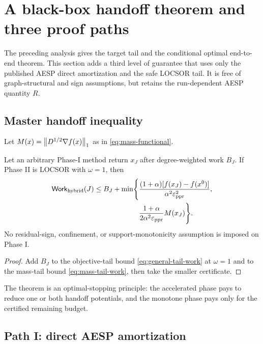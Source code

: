 \section{A black-box handoff theorem and three proof paths}
\label{sec:black-box-tradeoff}

The preceding analysis gives the target tail and the conditional optimal
end-to-end theorem.  This section adds a third level of guarantee that uses
only the published AESP direct amortization and the safe LOCSOR tail.  It is
free of graph-structural and sign assumptions, but retains the run-dependent
AESP quantity $R$.

\subsection{Master handoff inequality}

Let $M(x)=\left\lVert D^{1/2}\nabla f(x)\right\rVert_1$ as in
\cref{eq:mass-functional}.

\begin{theorem}
\label{thm:master-handoff}
Let an arbitrary Phase-I method return $x_J$ after degree-weighted work $B_J$.
If Phase II is LOCSOR with $\omega=1$, then
\begin{equation}
\begin{split}
  \mathsf{Work}_{\rm hybrid}(J)
  \leq B_J+\min\Biggl\{
    &\frac{(1+\alpha)[f(x_J)-f(x^0)]}
          {\alpha^2\varepsilon_{\mathrm{ppr}}^2},\\
    &\frac{1+\alpha}{2\alpha^2\varepsilon_{\mathrm{ppr}}}M(x_J)
  \Biggr\}.
  \label{eq:master-handoff}
\end{split}
\end{equation}
No residual-sign, confinement, or support-monotonicity assumption is imposed
on Phase I.
\end{theorem}

\begin{proof}
Add $B_J$ to the objective-tail bound
\cref{eq:general-tail-work} at $\omega=1$ and to the mass-tail bound
\cref{eq:mass-tail-work}, then take the smaller certificate.
\end{proof}

The theorem is an optimal-stopping principle: the accelerated phase pays to
reduce one or both handoff potentials, and the monotone phase pays only for
the certified remaining budget.

\subsection{Path I: direct AESP amortization}


